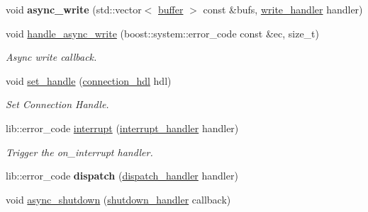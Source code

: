 \begin{DoxyCompactItemize}
\item 
void {\bfseries async\+\_\+write} (std\+::vector$<$ \hyperlink{structwebsocketpp_1_1transport_1_1buffer}{buffer} $>$ const \&bufs, \hyperlink{namespacewebsocketpp_1_1transport_addf5d728159e7aa2bce2a0df947b1560}{write\+\_\+handler} handler)\hypertarget{classwebsocketpp_1_1transport_1_1asio_1_1connection_a9f62627d2a0fd05278a0fb1d8761911b}{}\label{classwebsocketpp_1_1transport_1_1asio_1_1connection_a9f62627d2a0fd05278a0fb1d8761911b}

\item 
void \hyperlink{classwebsocketpp_1_1transport_1_1asio_1_1connection_a80d39c294a7888db4d55d46dac5b1fbc}{handle\+\_\+async\+\_\+write} (boost\+::system\+::error\+\_\+code const \&ec, size\+\_\+t)
\begin{DoxyCompactList}\small\item\em Async write callback. \end{DoxyCompactList}\item 
void \hyperlink{classwebsocketpp_1_1transport_1_1asio_1_1connection_ac6dae6a18678187b7da35f5b064c9ddd}{set\+\_\+handle} (\hyperlink{namespacewebsocketpp_a6b3d26a10ee7229b84b776786332631d}{connection\+\_\+hdl} hdl)
\begin{DoxyCompactList}\small\item\em Set Connection Handle. \end{DoxyCompactList}\item 
lib\+::error\+\_\+code \hyperlink{classwebsocketpp_1_1transport_1_1asio_1_1connection_a2fc9b41450047e40a3b5476c0e3bf853}{interrupt} (\hyperlink{namespacewebsocketpp_1_1transport_a8090563b066d7e8e31f7165be18dee51}{interrupt\+\_\+handler} handler)
\begin{DoxyCompactList}\small\item\em Trigger the on\+\_\+interrupt handler. \end{DoxyCompactList}\item 
lib\+::error\+\_\+code {\bfseries dispatch} (\hyperlink{namespacewebsocketpp_1_1transport_a6658447b2e10f4c712dd792aad0e0c78}{dispatch\+\_\+handler} handler)\hypertarget{classwebsocketpp_1_1transport_1_1asio_1_1connection_a660c671234223eb60517d26bbbc0268a}{}\label{classwebsocketpp_1_1transport_1_1asio_1_1connection_a660c671234223eb60517d26bbbc0268a}

\item 
void \hyperlink{classwebsocketpp_1_1transport_1_1asio_1_1connection_a7a3767d922bb2cc97f71dd2fb2f0e903}{async\+\_\+shutdown} (\hyperlink{namespacewebsocketpp_1_1transport_af39aff6fc4cb76f7df0d5322b734d156}{shutdown\+\_\+handler} callback)\hypertarget{classwebsocketpp_1_1transport_1_1asio_1_1connection_a7a3767d922bb2cc97f71dd2fb2f0e903}{}\label{classwebsocketpp_1_1transport_1_1asio_1_1connection_a7a3767d922bb2cc97f71dd2fb2f0e903}


\end{DoxyCompactItemize}
